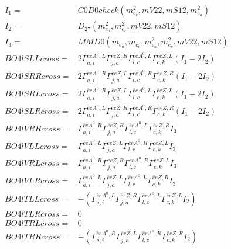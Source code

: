 \documentclass[A4,landscape]{article}
\begin{document}
\begin{align} 
I_1 = & C0D0check(m^2_{e_{{c}}}, mV22, mS12, m^2_{e_{{a}}}) \\ 
I_2 = & D_{27}(m^2_{e_{{a}}}, m^2_{e_{{c}}}, mV22, mS12) \\ 
I_3 = & MMD0(m_{e_{{a}}}, m_{e_{{c}}}, m^2_{e_{{a}}}, m^2_{e_{{c}}}, mV22, mS12) \\ 
  BO4lSLLcross= & 2  \Gamma^{\bar{e}e A^0 ,L}_{a, i} \Gamma^{\bar{e}e Z ,R}_{j, a} \Gamma^{\bar{e}e A^0 ,L}_{l, c} \Gamma^{\bar{e}e Z ,L}_{c, k} (I_1 - 2 I_2) \\ 
  BO4lSRRcross= & 2  \Gamma^{\bar{e}e A^0 ,R}_{a, i} \Gamma^{\bar{e}e Z ,L}_{j, a} \Gamma^{\bar{e}e A^0 ,R}_{l, c} \Gamma^{\bar{e}e Z ,R}_{c, k} (I_1 - 2 I_2) \\ 
  BO4lSRLcross= & 2  \Gamma^{\bar{e}e A^0 ,R}_{a, i} \Gamma^{\bar{e}e Z ,L}_{j, a} \Gamma^{\bar{e}e A^0 ,L}_{l, c} \Gamma^{\bar{e}e Z ,L}_{c, k} (I_1 - 2 I_2) \\ 
  BO4lSLRcross= & 2  \Gamma^{\bar{e}e A^0 ,L}_{a, i} \Gamma^{\bar{e}e Z ,R}_{j, a} \Gamma^{\bar{e}e A^0 ,R}_{l, c} \Gamma^{\bar{e}e Z ,R}_{c, k} (I_1 - 2 I_2) \\ 
  BO4lVRRcross= &  \Gamma^{\bar{e}e A^0 ,R}_{a, i} \Gamma^{\bar{e}e Z ,R}_{j, a} \Gamma^{\bar{e}e A^0 ,L}_{l, c} \Gamma^{\bar{e}e Z ,R}_{c, k} I_3 \\ 
  BO4lVLLcross= &  \Gamma^{\bar{e}e A^0 ,L}_{a, i} \Gamma^{\bar{e}e Z ,L}_{j, a} \Gamma^{\bar{e}e A^0 ,R}_{l, c} \Gamma^{\bar{e}e Z ,L}_{c, k} I_3 \\ 
  BO4lVRLcross= &  \Gamma^{\bar{e}e A^0 ,R}_{a, i} \Gamma^{\bar{e}e Z ,R}_{j, a} \Gamma^{\bar{e}e A^0 ,R}_{l, c} \Gamma^{\bar{e}e Z ,L}_{c, k} I_3 \\ 
  BO4lVLRcross= &  \Gamma^{\bar{e}e A^0 ,L}_{a, i} \Gamma^{\bar{e}e Z ,L}_{j, a} \Gamma^{\bar{e}e A^0 ,L}_{l, c} \Gamma^{\bar{e}e Z ,R}_{c, k} I_3 \\ 
  BO4lTLLcross= & -( \Gamma^{\bar{e}e A^0 ,L}_{a, i} \Gamma^{\bar{e}e Z ,R}_{j, a} \Gamma^{\bar{e}e A^0 ,L}_{l, c} \Gamma^{\bar{e}e Z ,L}_{c, k} I_2) \\ 
  BO4lTLRcross= & 0 \\ 
  BO4lTRLcross= & 0 \\ 
  BO4lTRRcross= & -( \Gamma^{\bar{e}e A^0 ,R}_{a, i} \Gamma^{\bar{e}e Z ,L}_{j, a} \Gamma^{\bar{e}e A^0 ,R}_{l, c} \Gamma^{\bar{e}e Z ,R}_{c, k} I_2) \\ 
\end{align} 
\end{document}
